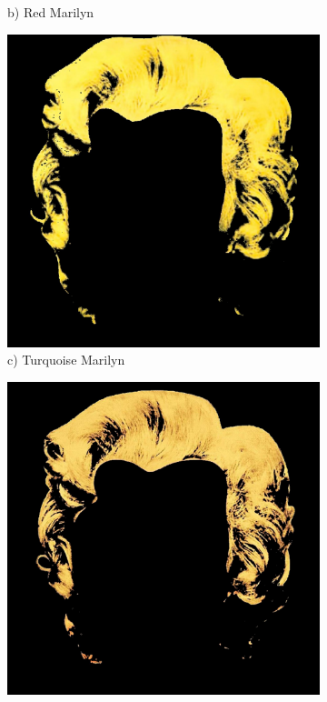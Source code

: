 \documentclass{article}
\begin{document}
\begin{figure}[htbp]
\begin{subfigure}[b]{0.19\textwidth}
        \caption*{b) Red Marilyn}
    \end{subfigure}
    \hfill
    \begin{subfigure}[b]{0.19\textwidth}
        \includegraphics[width=\textwidth]{main_files/figure-latex/10_2_turq_marilyn_hair_extraction.jpg}
        \caption*{c) Turquoise Marilyn}
    \end{subfigure}
    \hfill
    \begin{subfigure}[b]{0.19\textwidth}
        \includegraphics[width=\textwidth]{main_files/figure-latex/11_2_blue_marilyn_hair_extraction.jpg}

\end{subfigure}
\end{figure}
\end{document}
